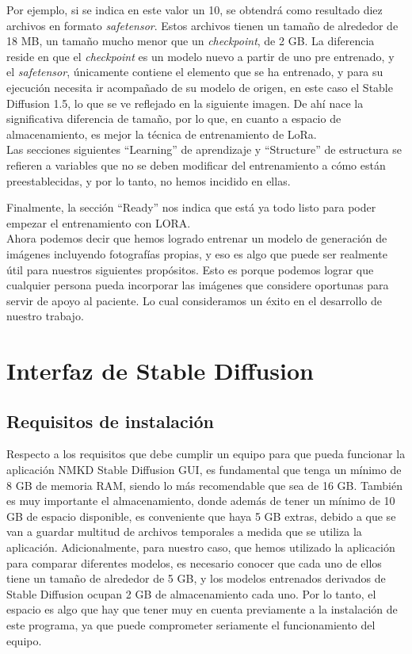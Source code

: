 Por ejemplo, si se indica en este valor un 10, se obtendrá como resultado diez archivos en formato \textit{safetensor}. Estos archivos tienen un tamaño de alrededor de 18 MB, un tamaño mucho menor que un \textit{checkpoint}, de 2 GB. La diferencia reside en que el \textit{checkpoint} es un modelo nuevo a partir de uno pre entrenado, y el \textit{safetensor}, únicamente contiene el elemento que se ha entrenado, y para su ejecución necesita ir acompañado de su modelo de origen, en este caso el Stable Diffusion 1.5, lo que se ve reflejado en la siguiente imagen. De ahí nace la significativa diferencia de tamaño, por lo que, en cuanto a espacio de almacenamiento, es mejor la técnica de entrenamiento de LoRa. \\


Las secciones siguientes ``Learning'' de aprendizaje y ``Structure'' de estructura se refieren a variables que no se deben modificar del entrenamiento a cómo están preestablecidas, y por lo tanto, no hemos incidido en ellas.

Finalmente, la sección ``Ready'' nos indica que está ya todo listo para poder empezar el entrenamiento con LORA. \\

Ahora podemos decir que hemos logrado entrenar un modelo de generación de imágenes incluyendo fotografías propias, y eso es algo que puede ser realmente útil para nuestros siguientes propósitos. Esto es porque podemos lograr que cualquier persona pueda incorporar las imágenes que considere oportunas para servir de apoyo al paciente. Lo cual consideramos un éxito en el desarrollo de nuestro trabajo. 


\section{Interfaz de Stable Diffusion}

\subsection{Requisitos de instalación}

Respecto a los requisitos que debe cumplir un equipo para que pueda funcionar la aplicación NMKD Stable Diffusion GUI, es fundamental que tenga un mínimo de 8 GB de memoria RAM, siendo lo más recomendable que sea de 16 GB. También es muy importante el almacenamiento, donde además de tener un mínimo de 10 GB de espacio disponible, es conveniente que haya 5 GB extras, debido a que se van a guardar multitud de archivos temporales a medida que se utiliza la aplicación. Adicionalmente, para nuestro caso, que hemos utilizado la aplicación para comparar diferentes modelos, es necesario conocer que cada uno de ellos tiene un tamaño de alrededor de 5 GB, y los modelos entrenados derivados de Stable Diffusion ocupan 2 GB de almacenamiento cada uno. Por lo tanto, el espacio es algo que hay que tener muy en cuenta previamente a la instalación de este programa, ya que puede comprometer seriamente el funcionamiento del equipo. \\

